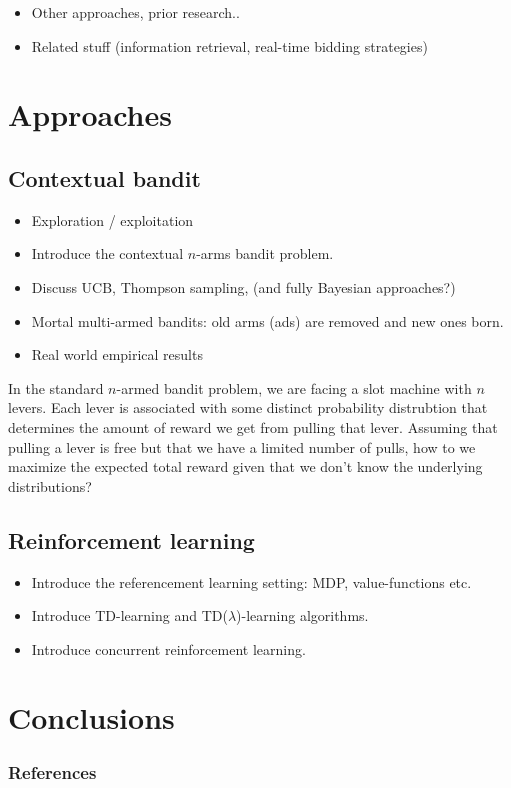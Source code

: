 \documentclass{article} %
\begin{document}
\begin{itemize}
  \item
  Other approaches, prior research..
  \item
  Related stuff (information retrieval, real-time bidding strategies)
\end{itemize}

\section{Approaches}


\subsection{Contextual bandit}
\begin{itemize}
  \item{Exploration / exploitation}
  \item{Introduce the contextual $n$-arms bandit problem.}
  \item{Discuss UCB, Thompson sampling, (and fully Bayesian approaches?)}
  \item{Mortal multi-armed bandits: old arms (ads) are removed and new ones
    born.}
  \item{Real world empirical results}
\end{itemize}

In the standard $n$-armed bandit problem, we are facing a slot machine with
$n$ levers. Each lever is associated with some distinct probability distrubtion
that determines the amount of reward we get from pulling that lever. Assuming
that pulling a lever is free but that we have a limited number of pulls, how to
we maximize the expected total reward given that we don't know the underlying
distributions? \cite{book}


\subsection{Reinforcement learning}

\begin{itemize}
  \item{Introduce the referencement learning setting: MDP, value-functions
    etc.}
  \item{Introduce TD-learning and TD($\lambda$)-learning algorithms.}
  \item{Introduce concurrent reinforcement learning.}
\end{itemize}

\section{Conclusions}

\subsubsection*{References}
\nocite{*}

\printbibliography[heading=none]
\end{document}
